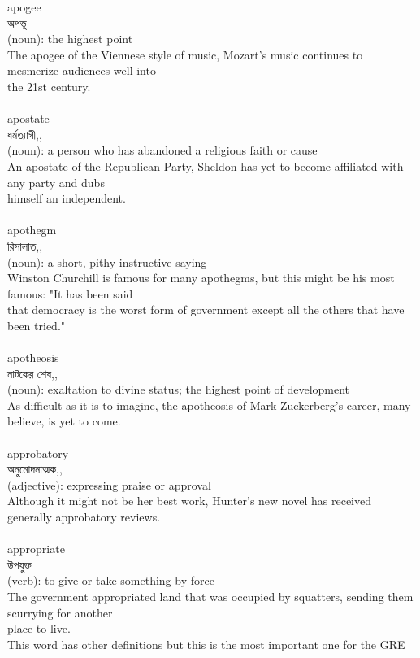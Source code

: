 \documentclass{article}
\begin{document}
{apogee}\\
{অপভূ}\\
{(noun): the highest point\\The apogee of the Viennese style of music, Mozart's music continues to mesmerize audiences well into\\the 21st century.\\}\\
{apostate}\\
{ধর্মত্যাগী,,}\\
{(noun): a person who has abandoned a religious faith or cause\\An apostate of the Republican Party, Sheldon has yet to become affiliated with any party and dubs\\himself an independent.\\}\\
{apothegm}\\
{রিসালাত,,}\\
{(noun): a short, pithy instructive saying\\Winston Churchill is famous for many apothegms, but this might be his most famous: "It has been said\\that democracy is the worst form of government except all the others that have been tried."\\}\\
{apotheosis}\\
{নাটকের শেষ,,}\\
{(noun): exaltation to divine status; the highest point of development\\As difficult as it is to imagine, the apotheosis of Mark Zuckerberg's career, many believe, is yet to come.\\}\\
{approbatory}\\
{অনুমোদনাত্মক,,}\\
{(adjective): expressing praise or approval\\Although it might not be her best work, Hunter's new novel has received generally approbatory reviews.\\}\\
{appropriate}\\
{উপযুক্ত}\\
{(verb): to give or take something by force\\The government appropriated land that was occupied by squatters, sending them scurrying for another\\place to live.\\This word has other definitions but this is the most important one for the GRE\\}\\
\end{document}

